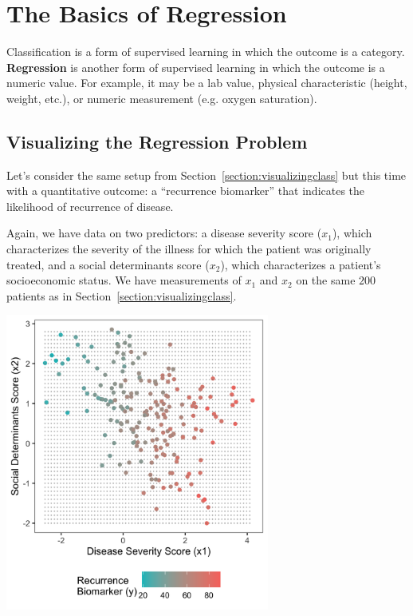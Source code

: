 \chapter{The Basics of Regression \label{chapter:regression}}

Classification is a form of supervised learning in which the outcome is a category. \textbf{Regression} is another form of supervised learning in which the outcome is a numeric value. For example, it may be a lab value, physical characteristic (height, weight, etc.), or numeric measurement (e.g. oxygen saturation).


\section{Visualizing the Regression Problem \label{section:visualizingreg}}

Let's consider the same setup from Section~\ref{section:visualizingclass} but this time with a quantitative outcome: a ``recurrence biomarker'' that indicates the likelihood of recurrence of disease.

Again, we have data on two predictors: a disease severity score ($x_1$), which characterizes the severity of the illness for which the patient was originally treated, and a social determinants score ($x_2$), which characterizes a patient's socioeconomic status. We have measurements of $x_1$ and $x_2$ on the same $200$ patients as in Section~\ref{section:visualizingclass}.
\begin{center}
\includegraphics[width=0.65\textwidth]{img/esl-reg-just-data.png}
\end{center}

